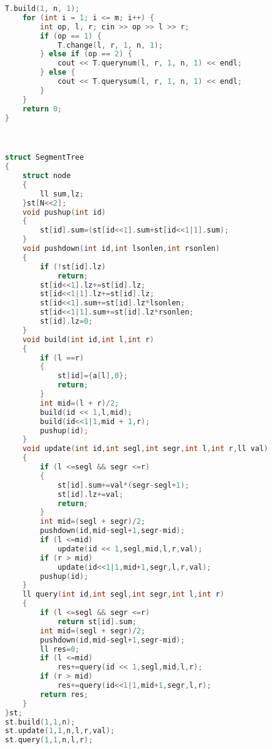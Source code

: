 \begin{lstlisting}[language=c++]
    T.build(1, n, 1);
    for (int i = 1; i <= m; i++) {
        int op, l, r; cin >> op >> l >> r;
        if (op == 1) {
            T.change(l, r, 1, n, 1);
        } else if (op == 2) {
            cout << T.querynum(l, r, 1, n, 1) << endl;
        } else {
            cout << T.querysum(l, r, 1, n, 1) << endl;
        }
    }
    return 0;
}



struct SegmentTree
{
    struct node
    {
        ll sum,lz;
    }st[N<<2];
    void pushup(int id)
    {
        st[id].sum=(st[id<<1].sum+st[id<<1|1].sum);
    }
    void pushdown(int id,int lsonlen,int rsonlen)
    {
        if (!st[id].lz)
            return;
        st[id<<1].lz+=st[id].lz;
        st[id<<1|1].lz+=st[id].lz;
        st[id<<1].sum+=st[id].lz*lsonlen;
        st[id<<1|1].sum+=st[id].lz*rsonlen;
        st[id].lz=0;
    }
    void build(int id,int l,int r)
    {
        if (l ==r)
        {
            st[id]={a[l],0};
            return;
        }
        int mid=(l + r)/2;
        build(id << 1,l,mid);
        build(id<<1|1,mid + 1,r);
        pushup(id);
    }
    void update(int id,int segl,int segr,int l,int r,ll val)
    {
        if (l <=segl && segr <=r)
        {
            st[id].sum+=val*(segr-segl+1);
            st[id].lz+=val;
            return;
        }
        int mid=(segl + segr)/2;
        pushdown(id,mid-segl+1,segr-mid);
        if (l <=mid)
            update(id << 1,segl,mid,l,r,val);
        if (r > mid)
            update(id<<1|1,mid+1,segr,l,r,val);
        pushup(id);
    }
    ll query(int id,int segl,int segr,int l,int r)
    {
        if (l <=segl && segr <=r)
            return st[id].sum;
        int mid=(segl + segr)/2;
        pushdown(id,mid-segl+1,segr-mid);
        ll res=0;
        if (l <=mid)
            res+=query(id << 1,segl,mid,l,r);
        if (r > mid)
            res+=query(id<<1|1,mid+1,segr,l,r);
        return res;
    }
}st;
st.build(1,1,n);
st.update(1,1,n,l,r,val);
st.query(1,1,n,l,r);
\end{lstlisting}

